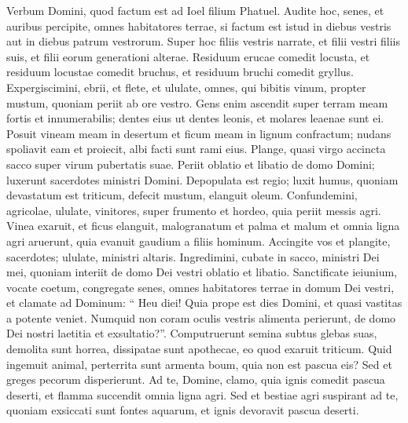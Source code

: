 \begin{biblechapter}
 \verse Verbum Domini, quod factum est ad Ioel filium Phatuel.
 \verse Audite hoc, senes,
 et auribus percipite, omnes habitatores terrae,
 si factum est istud in diebus vestris
 aut in diebus patrum vestrorum.
 \verse Super hoc filiis vestris narrate,
 et filii vestri filiis suis,
 et filii eorum generationi alterae.
 \verse Residuum erucae comedit locusta,
 et residuum locustae comedit bruchus,
 et residuum bruchi comedit gryllus.
 \verse Expergiscimini, ebrii, et flete,
 et ululate, omnes, qui bibitis vinum,
 propter mustum,
 quoniam periit ab ore vestro.
 \verse Gens enim ascendit super terram meam
 fortis et innumerabilis;
 dentes eius ut dentes leonis,
 et molares leaenae sunt ei.
 \verse Posuit vineam meam in desertum
 et ficum meam in lignum confractum;
 nudans spoliavit eam et proiecit,
 albi facti sunt rami eius.
 \verse Plange, quasi virgo accincta sacco
 super virum pubertatis suae.
 \verse Periit oblatio et libatio
 de domo Domini;
 luxerunt sacerdotes
 ministri Domini.
 \verse Depopulata est regio;
 luxit humus,
 quoniam devastatum est triticum,
 defecit mustum,
 elanguit oleum.
 \verse Confundemini, agricolae,
 ululate, vinitores,
 super frumento et hordeo,
 quia periit messis agri.
 \verse Vinea exaruit,
 et ficus elanguit,
 malogranatum et palma et malum
 et omnia ligna agri aruerunt,
 quia evanuit gaudium
 a filiis hominum.
 \verse Accingite vos et plangite, sacerdotes;
 ululate, ministri altaris.
 Ingredimini, cubate in sacco,
 ministri Dei mei,
 quoniam interiit de domo Dei vestri
 oblatio et libatio.
 \verse Sanctificate ieiunium,
 vocate coetum,
 congregate senes,
 omnes habitatores terrae
 in domum Dei vestri,
 et clamate ad Dominum:
 \verse “ Heu diei!
 Quia prope est dies Domini,
 et quasi vastitas a potente veniet.
 \verse Numquid non coram oculis vestris
 alimenta perierunt,
 de domo Dei nostri
 laetitia et exsultatio?”.
 \verse Computruerunt semina
 subtus glebas suas,
 demolita sunt horrea,
 dissipatae sunt apothecae,
 eo quod exaruit triticum.
 \verse Quid ingemuit animal,
 perterrita sunt armenta boum,
 quia non est pascua eis?
 Sed et greges pecorum disperierunt.
 \verse Ad te, Domine, clamo,
 quia ignis comedit
 pascua deserti,
 et flamma succendit
 omnia ligna agri.
 \verse Sed et bestiae agri
 suspirant ad te,
 quoniam exsiccati sunt fontes aquarum,
 et ignis devoravit
 pascua deserti.
 

\end{biblechapter}
